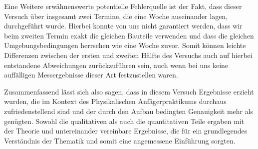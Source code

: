 \documentclass{article}
\newcommand\invisiblesection[1]{%
  \refstepcounter{section}%
  \addcontentsline{toc}{section}{\protect\numberline{\thesection}#1}%
  \sectionmark{#1}\phantom{}}
\begin{document}
Eine Weitere erwähnenswerte potentielle Fehlerquelle ist der Fakt, dass dieser Versuch über insgesamt zwei Termine, die eine Woche auseinander lagen, durchgeführt wurde. Hierbei konnte von uns nicht garantiert werden, dass wir beim zweiten Termin exakt die gleichen Bauteile verwenden und dass die gleichen Umgebungsbedingungen herrschen wie eine Woche zuvor. Somit können leichte Differenzen zwischen der ersten und zweiten Hälfte des Versuchs auch auf hierbei entstandene Abweichungen zurückzuführen sein, auch wenn bei uns keine auffälligen Messergebnisse dieser Art festzustellen waren. 

Zusammenfassend lässt sich also sagen, dass in diesem Versuch Ergebnisse erzieht wurden, die im Kontext des Physikalischen Anfägerpraktikums durchaus zufriedenstellend sind und der durch den Aufbau bedingten Genauigkeit mehr als genügten. Sowohl die qualitativen als auch die quantitativen Teile ergaben mit der Theorie und untereinander vereinbare Ergebnisse, die für ein grundlegendes Verständnis der Thematik und somit eine angemessene Einführung sorgten. 

 
\newpage


\end{document}
